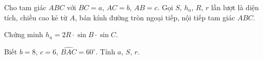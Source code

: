 \begin{bt}%
	Cho tam giác $ABC$ với $BC=a$, $AC= b$, $AB=c$. Gọi $S$, $h_a$, $R$, $r$ lần lượt là diện tích, chiều cao kẻ từ $A$, bán kính đường tròn ngoại tiếp, nội tiếp tam giác $ABC$.
	\begin{listEX}[1]
		\item Chứng minh $h_a = 2 R \cdot \sin B\cdot \sin C$.
		\item Biết $b=8$, $c=6$, $\widehat {BAC}= 60^\circ$. Tính $a$, $S$, $r$.
	\end{listEX}
\end{bt}


